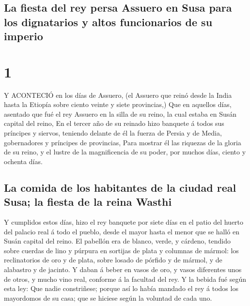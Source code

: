 \hypertarget{la-fiesta-del-rey-persa-assuero-en-susa-para-los-dignatarios-y-altos-funcionarios-de-su-imperio}{%
\subsection{La fiesta del rey persa Assuero en Susa para los dignatarios
y altos funcionarios de su
imperio}\label{la-fiesta-del-rey-persa-assuero-en-susa-para-los-dignatarios-y-altos-funcionarios-de-su-imperio}}

\hypertarget{section}{%
\section{1}\label{section}}

 Y ACONTECIÓ en los días de Assuero, (el Assuero que reinó
desde la India hasta la Etiopía sobre ciento veinte y siete provincias,)
 Que en aquellos días, asentado que fué el rey Assuero en la
silla de su reino, la cual estaba en Susán capital del reino,
 En el tercer año de su reinado hizo banquete á todos sus
príncipes y siervos, teniendo delante de él la fuerza de Persia y de
Media, gobernadores y príncipes de provincias,  Para mostrar
él las riquezas de la gloria de su reino, y el lustre de la
magnificencia de su poder, por muchos días, ciento y ochenta días.

\hypertarget{la-comida-de-los-habitantes-de-la-ciudad-real-susa-la-fiesta-de-la-reina-wasthi}{%
\subsection{La comida de los habitantes de la ciudad real Susa; la
fiesta de la reina
Wasthi}\label{la-comida-de-los-habitantes-de-la-ciudad-real-susa-la-fiesta-de-la-reina-wasthi}}

 Y cumplidos estos días, hizo el rey banquete por siete días
en el patio del huerto del palacio real á todo el pueblo, desde el mayor
hasta el menor que se halló en Susán capital del reino.  El
pabellón era de blanco, verde, y cárdeno, tendido sobre cuerdas de lino
y púrpura en sortijas de plata y columnas de mármol: los reclinatorios
de oro y de plata, sobre losado de pórfido y de mármol, y de alabastro y
de jacinto.  Y daban á beber en vasos de oro, y vasos
diferentes unos de otros, y mucho vino real, conforme á la facultad del
rey.  Y la bebida fué según esta ley: Que nadie constriñese;
porque así lo había mandado el rey á todos los mayordomos de su casa;
que se hiciese según la voluntad de cada uno.

